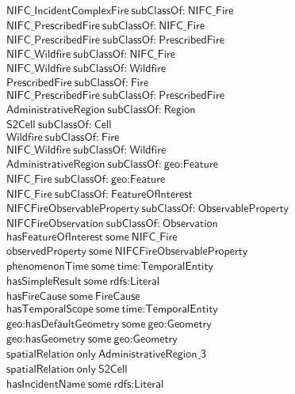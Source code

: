 \begin{align}
  \textsf{NIFC\_IncidentComplexFire}~\textsf{subClassOf:}~\textsf{NIFC\_Fire}\\
  \textsf{NIFC\_PrescribedFire}~\textsf{subClassOf:}~\textsf{NIFC\_Fire}\\
  \textsf{NIFC\_PrescribedFire}~\textsf{subClassOf:}~\textsf{PrescribedFire}\\
  \textsf{NIFC\_Wildfire}~\textsf{subClassOf:}~\textsf{NIFC\_Fire}\\
  \textsf{NIFC\_Wildfire}~\textsf{subClassOf:}~\textsf{Wildfire}\\
  \textsf{PrescribedFire}~\textsf{subClassOf:}~\textsf{Fire}\\
  \textsf{NIFC\_PrescribedFire}~\textsf{subClassOf:}~\textsf{PrescribedFire}\\
  \textsf{AdministrativeRegion}~\textsf{subClassOf:}~\textsf{Region}\\
  \textsf{S2Cell}~\textsf{subClassOf:}~\textsf{Cell}\\
  \textsf{Wildfire}~\textsf{subClassOf:}~\textsf{Fire}\\
  \textsf{NIFC\_Wildfire}~\textsf{subClassOf:}~\textsf{Wildfire}\\
  \textsf{AdministrativeRegion}~\textsf{subClassOf:}~\textsf{geo:Feature}\\
  \textsf{NIFC\_Fire}~\textsf{subClassOf:}~\textsf{geo:Feature}\\
  \textsf{NIFC\_Fire}~\textsf{subClassOf:}~\textsf{FeatureOfInterest}\\
  \textsf{NIFCFireObservableProperty}~\textsf{subClassOf:}~\textsf{ObservableProperty}\\
  \textsf{NIFCFireObservation}~\textsf{subClassOf:}~\textsf{Observation}\\
  \textsf{hasFeatureOfInterest}~\textsf{some}~\textsf{NIFC\_Fire}\\
  \textsf{observedProperty}~\textsf{some}~\textsf{NIFCFireObservableProperty}\\
  \textsf{phenomenonTime}~\textsf{some}~\textsf{time:TemporalEntity}\\
  \textsf{hasSimpleResult}~\textsf{some}~\textsf{rdfs:Literal}\\
  \textsf{hasFireCause}~\textsf{some}~\textsf{FireCause}\\
  \textsf{hasTemporalScope}~\textsf{some}~\textsf{time:TemporalEntity}\\
  \textsf{geo:hasDefaultGeometry}~\textsf{some}~\textsf{geo:Geometry}\\
  \textsf{geo:hasGeometry}~\textsf{some}~\textsf{geo:Geometry}\\
  \textsf{spatialRelation}~\textsf{only}~\textsf{AdministrativeRegion\_3}\\
  \textsf{spatialRelation}~\textsf{only}~\textsf{S2Cell}\\
  \textsf{hasIncidentName}~\textsf{some}~\textsf{rdfs:Literal}\end{align}


